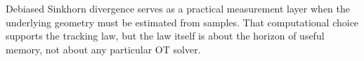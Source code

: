 \begin{remark}
Debiased Sinkhorn divergence serves as a practical measurement layer when the
underlying geometry must be estimated from samples. That computational choice
supports the tracking law, but the law itself is about the horizon of useful
memory, not about any particular OT solver.
\end{remark}
